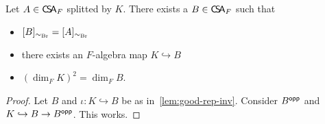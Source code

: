  \begin{corollary}\label{cor:good-rep}
   Let $A\in\operatorname{\mathsf{C}\!\mathsf{S}\!\mathsf{A}}_{F}$ splitted by $K$. There exists a $B \in \operatorname{\mathsf{C}\!\mathsf{S}\!\mathsf{A}}_{F}$ such that
   \begin{itemize}
     \item $[B]_{\sim_{\operatorname{Br}}}=[A]_{\sim_{\operatorname{Br}}}$
     \item there exists an $F$-algebra map $K\hookrightarrow B$
     \item  ${\left(\dim_{F}K\right)}^{2}=\dim_{F}B$.
  \end{itemize}
 \end{corollary}

 \begin{proof}
   Let $B$ and $\iota : K \hookrightarrow B$ be as in~\cref{lem:good-rep-inv}. Consider $B^{\mathsf{opp}}$ and $K \hookrightarrow B \to B^{\mathsf{opp}}$. This works.
 \end{proof}

